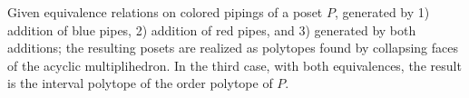 \documentclass{article}
\begin{document}





\begin{conjecture}
Given equivalence relations on colored pipings of a poset $P$, generated by 1) addition of blue pipes, 2) addition of red pipes, and 3) generated by both additions; the resulting posets are realized as polytopes found by collapsing faces of the acyclic multiplihedron. In the third case, with both equivalences, the result is the interval polytope of the order polytope of $P.$
\end{conjecture} 
\end{document}
